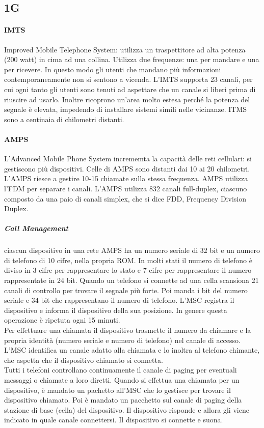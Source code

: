\documentclass{article}
\begin{document}
\subsection{1G}

\paragraph{IMTS} Improved Mobile Telephone System: utilizza un traspettitore ad
alta potenza (200 watt) in cima ad una collina. Utilizza due frequenze: una per
mandare e una per ricevere. In questo modo gli utenti che mandano più
informazioni contemporaneamente non si sentono a vicenda. L'IMTS supporta 23
canali, per cui ogni tanto gli utenti sono tenuti ad aspettare che un canale si
liberi prima di riuscire ad usarlo. Inoltre ricoprono un'area molto estesa
perché la potenza del segnale è elevata, impedendo di installare sistemi
simili nelle vicinanze. ITMS sono a centinaia di chilometri distanti.

\paragraph{AMPS} L'Advanced Mobile Phone System incrememta la capacità delle
reti cellulari: si gestiscono più dispositivi. Celle di AMPS sono distanti dai
10 ai 20 chilometri. L'AMPS riesce a gestire 10-15 chiamate sulla stessa
frequenza. AMPS utilizza l'FDM per separare i canali. L'AMPS utilizza 832
canali full-duplex, ciascuno composto da una paio di canali simplex, che si dice
FDD, Frequency Division Duplex.
\subparagraph{Call Management} ciascun dispositivo in una rete AMPS ha un numero
seriale di 32 bit e un numero di telefono di 10 cifre, nella propria ROM.
In molti stati il numero di telefono è diviso in 3 cifre per rappresentare lo
stato e 7 cifre per rappresentare il numero rappresentate in 24 bit. Quando un
telefono si connette ad una cella scansiona 21 canali di controllo per trovare
il segnale più forte. Poi manda i bit del numero seriale e 34 bit che
rappresentano il numero di telefono. L'MSC registra il dispositivo e informa il
dispositivo della sua posizione. In genere questa operazione è ripetuta ogni 15
minuti.\\
Per effettuare una chiamata il dispositivo trasmette il numero da chiamare e la
propria identità (numero seriale e numero di telefono) nel canale di accesso.
L'MSC identifica un canale adatto alla chiamata e lo inoltra al telefono
chimante, che aspetta che il dispositivo chiamato si connetta.\\
Tutti i telefoni controllano continuamente il canale di paging per eventuali
messaggi o chiamate a loro diretti. Quando si effettua una chiamata per un
dispositivo, è mandato un pachetto all'MSC che lo gestisce per trovare il
dispositivo chiamato. Poi è mandato un pacchetto sul canale di paging della
stazione di base (cella) del dispositivo. Il dispositivo risponde e allora gli
viene indicato in quale canale connettersi. Il dispositivo si connette e suona.
\end{document}
